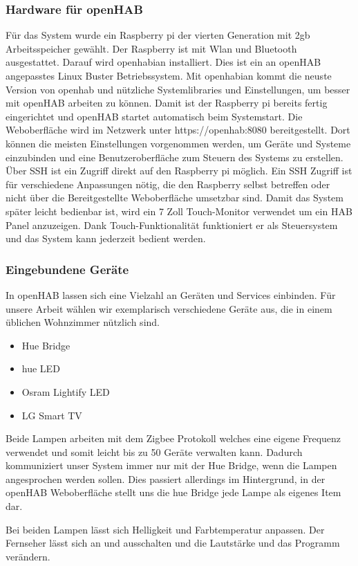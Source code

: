 	\subsubsection{Hardware für openHAB}
		Für das System wurde ein Raspberry pi der vierten Generation mit 2gb Arbeitsspeicher gewählt. Der Raspberry ist mit Wlan und Bluetooth ausgestattet. Darauf wird openhabian installiert. Dies ist ein an openHAB angepasstes Linux Buster Betriebssystem. Mit openhabian kommt die neuste Version von openhab und nützliche Systemlibraries und Einstellungen, um besser mit openHAB arbeiten zu können. Damit ist der Raspberry pi bereits fertig eingerichtet und openHAB startet automatisch beim Systemstart. Die Weboberfläche wird im Netzwerk unter https://openhab:8080 bereitgestellt. Dort können die meisten Einstellungen vorgenommen werden, um Geräte und Systeme einzubinden und eine Benutzeroberfläche zum Steuern des Systems zu erstellen. Über SSH ist ein Zugriff direkt auf den Raspberry pi möglich. Ein SSH Zugriff ist für verschiedene Anpassungen nötig, die den Raspberry selbst betreffen oder nicht über die Bereitgestellte Weboberfläche umsetzbar sind.
		Damit das System später leicht bedienbar ist, wird ein 7 Zoll Touch-Monitor verwendet um ein HAB Panel anzuzeigen. Dank Touch-Funktionalität funktioniert er als Steuersystem und das System kann jederzeit bedient werden.
		
	\subsubsection{Eingebundene Geräte}
		In openHAB lassen sich eine Vielzahl an Geräten und Services einbinden. Für unsere Arbeit wählen wir exemplarisch verschiedene Geräte aus, die in einem üblichen Wohnzimmer nützlich sind.
		\begin{itemize}
			\item Hue Bridge
			\item  hue LED
			\item Osram Lightify LED
			\item LG Smart TV
		\end{itemize}
		Beide Lampen arbeiten mit dem Zigbee Protokoll welches eine eigene Frequenz verwendet und somit leicht bis zu 50 Geräte verwalten kann. Dadurch kommuniziert unser System immer nur mit der Hue Bridge, wenn die Lampen angesprochen werden sollen. Dies passiert allerdings im Hintergrund, in der openHAB Weboberfläche stellt uns die hue Bridge jede Lampe als eigenes Item dar.
		
		Bei beiden Lampen lässt sich Helligkeit und Farbtemperatur anpassen. Der Fernseher lässt sich an und ausschalten und die Lautstärke und das Programm verändern.
		
